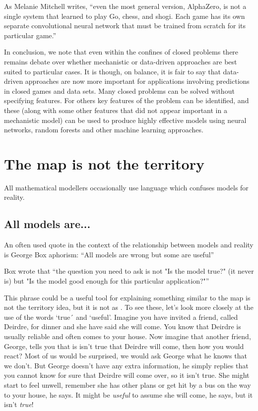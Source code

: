 As Melanie Mitchell writes, “even the most general version, AlphaZero, is not a single system that learned to play Go, chess, and shogi. Each game has its own separate convolutional neural network that must be trained from scratch for its particular game.” 


In conclusion, we note that even within the confines of closed problems there remains debate over whether mechanistic or data-driven approaches are best suited to particular cases. It is though, on balance, it is fair to say that data-driven approaches are now more important for applications involving predictions in closed games and data sets. Many closed problems can be solved without specifying features. For others key features of the problem can be identified, and these (along with some other features that did not appear important in a mechanistic model) can be used to produce highly effective models using neural networks, random forests and other machine learning approaches. 

\section{The map is not the territory}

All mathematical modellers occasionally use language which confuses models for reality. 


\subsection{All models are...}

An often used quote in the context of the relationship between models and reality is George Box aphorism: ``All models are wrong but some are useful''

Box wrote that ``the question you need to ask is not "Is the model true?" (it never is) but "Is the model good enough for this particular application?"'' 

This phrase could be a useful tool for explaining something similar to the map is not the territory idea, but it is not as . To see these, let's look more closely at the use of the words `true´ and `useful'. Imagine you have invited a friend, called Deirdre, for dinner and she have said she will come. You know that Deirdre is usually reliable and often comes to your house. Now imagine that another friend, George, tells you that is isn't true that Deirdre will come, then how you would react? Most of us would be surprised, we would ask George what he knows that we don't. But George doesn't have any extra information, he simply replies that you cannot know for sure that Deirdre will come over, so it isn't true. She might start to feel unwell, remember she has other plans or get hit by a bus on the way to your house, he says. It might be {\it useful} to assume she will come, he says, but it isn't {\it true}!

